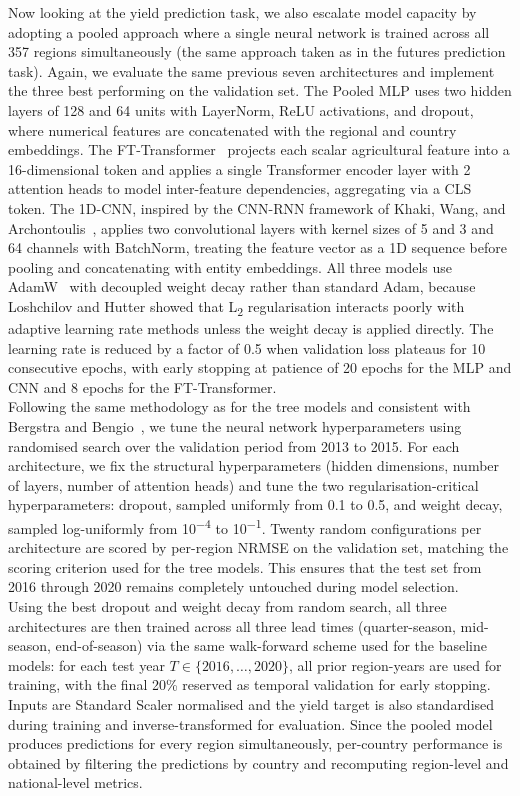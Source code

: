 \documentclass[pdflatex,sn-mathphys-num, oneside, 11pt]{sn-jnl}%
\theoremstyle{thmstyleone}%
\theoremstyle{thmstyletwo}%
\theoremstyle{thmstylethree}%
\begin{document}
Now looking at the yield prediction task, we also escalate model capacity by adopting a pooled approach where a single neural network is trained across all 357 regions simultaneously (the same approach taken as in the futures prediction task). Again, we evaluate the same previous seven architectures and implement the three best performing on the validation set. The Pooled MLP uses two hidden layers of 128 and 64 units with LayerNorm, ReLU activations, and dropout, where numerical features are concatenated with the regional and country embeddings. The FT-Transformer~\cite{bib_gorishniy} projects each scalar agricultural feature into a 16-dimensional token and applies a single Transformer encoder layer with 2 attention heads to model inter-feature dependencies, aggregating via a CLS token. The 1D-CNN, inspired by the CNN-RNN framework of Khaki, Wang, and Archontoulis~\cite{bib_khaki}, applies two convolutional layers with kernel sizes of 5 and 3 and 64 channels with BatchNorm, treating the feature vector as a 1D sequence before pooling and concatenating with entity embeddings. All three models use AdamW~\cite{bib_loshchilov} with decoupled weight decay rather than standard Adam, because Loshchilov and Hutter showed that L\textsubscript{2} regularisation interacts poorly with adaptive learning rate methods unless the weight decay is applied directly. The learning rate is reduced by a factor of 0.5 when validation loss plateaus for 10 consecutive epochs, with early stopping at patience of 20 epochs for the MLP and CNN and 8 epochs for the FT-Transformer.\\

Following the same methodology as for the tree models and consistent with Bergstra and Bengio~\cite{bib33}, we tune the neural network hyperparameters using randomised search over the validation period from 2013 to 2015. For each architecture, we fix the structural hyperparameters (hidden dimensions, number of layers, number of attention heads) and tune the two regularisation-critical hyperparameters: dropout, sampled uniformly from 0.1 to 0.5, and weight decay, sampled log-uniformly from 10\textsuperscript{$-$4} to 10\textsuperscript{$-$1}. Twenty random configurations per architecture are scored by per-region NRMSE on the validation set, matching the scoring criterion used for the tree models. This ensures that the test set from 2016 through 2020 remains completely untouched during model selection.\\

Using the best dropout and weight decay from random search, all three architectures are then trained across all three lead times (quarter-season, mid-season, end-of-season) via the same walk-forward scheme used for the baseline models: for each test year $T \in \{2016, \ldots, 2020\}$, all prior region-years are used for training, with the final 20\% reserved as temporal validation for early stopping. Inputs are Standard Scaler normalised and the yield target is also standardised during training and inverse-transformed for evaluation. Since the pooled model produces predictions for every region simultaneously, per-country performance is obtained by filtering the predictions by country and recomputing region-level and national-level metrics.\\
\end{document}
